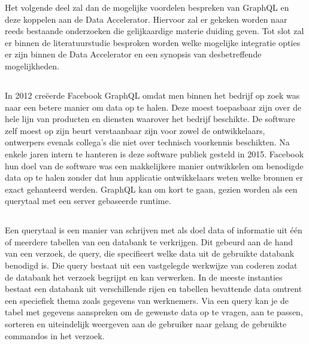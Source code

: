 Het volgende deel zal dan de mogelijke voordelen bespreken van GraphQL en deze koppelen aan de Data Accelerator. Hiervoor zal er gekeken worden naar reeds bestaande onderzoeken die gelijkaardige materie duiding geven.
Tot slot zal er binnen de literatuurstudie besproken worden welke mogelijke integratie opties er zijn binnen de Data Accelerator en een synopsis van desbetreffende mogelijkheden.

\subsection{}%
\label{sec:Gegevens ophalen}
In 2012 creëerde Facebook GraphQL omdat men binnen het bedrijf op zoek was naar een betere manier om data op te halen. Deze moest toepasbaar zijn over de hele lijn van producten en diensten waarover het bedrijf beschikte. De software zelf moest op zijn beurt verstaanbaar zijn voor zowel de ontwikkelaars, ontwerpers evenals collega’s die niet over technisch voorkennis beschikten. Na enkele jaren intern te hanteren is deze software publiek gesteld in 2015. Facebook hun doel van de software was een makkelijkere manier ontwikkelen om benodigde data op te halen zonder dat hun applicatie ontwikkelaars weten welke bronnen er exact gehanteerd werden. GraphQL kan om kort te gaan, gezien worden als een querytaal met een server gebaseerde runtime.

\subsection{}%
\label{sec:Querytaal}
Een querytaal is een manier van schrijven met als doel data of informatie uit één of meerdere tabellen van een databank te verkrijgen.
Dit gebeurd aan de hand van een verzoek, de query, die specifieert welke data uit de gebruikte databank benodigd is. Die query bestaat uit een vastgelegde werkwijze van coderen zodat de databank het verzoek begrijpt en kan verwerken. In de meeste instanties bestaat een databank uit verschillende rijen en tabellen bevattende data omtrent een speciefiek thema zoals gegevens van werknemers. Via een query kan je de tabel met gegevens aanspreken om de gewenste data op te vragen, aan te passen, sorteren en uiteindelijk weergeven aan de gebruiker naar gelang de gebruikte commandos in het verzoek.

